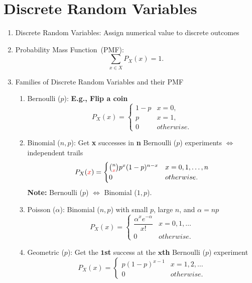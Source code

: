 \chapter{Discrete Random Variables}
\begin{enumerate}
    \item Discrete Random Variables: Assign numerical value to discrete outcomes
    \item Probability Mass Function~(PMF): \[\sum_{x\in X}P_X(x)=1.\]
    \item Families of Discrete Random Variables and their PMF{
        \begin{enumerate}
            \item Bernoulli ($p$): \textbf{E.g., Flip a coin}{
                \[ P_X(x) =
                \begin{cases}
                    1-p & x=0, \\
                    p   & x=1, \\
                    0   & otherwise.
                \end{cases} \]
            }
            \item Binomial ($n, p$): Get \textbf{x} successes in \textbf{n} Bernoulli ($p$) experiments $\iff$ independent trails{
                \[P_X(\textcolor{red}{x}) = {
                    \begin{cases}
                        \binom{n}{\textcolor{red}{x}}p^x(1-p)^{n-x} & x=0,1,\ldots,n \\
                        0 & otherwise.
                    \end{cases}
                }\]
                \textbf{Note:} Bernoulli ($p$) $\iff$ Binomial ($1, p$).
            }
            \item Poisson ($\alpha$): Binomial ($n, p$) with small $p$, large $n$, and $\alpha=np${
                \[ P_X(x) =
                \begin{cases}
                    \dfrac{\alpha^x e^{-\alpha}}{x!}   & x=0,1,\ldots \\
                    0   & otherwise.
                \end{cases} \]
            }
            \item Geometric ($p$): Get the $\bm{1}$\textbf{st} success at the $\bm{x}$\textbf{th} Bernoulli ($p$) experiment {
                \[ P_X(x) =
                \begin{cases}
                    p(1-p)^{x-1} & x=1,2,\ldots \\
                    0   & otherwise.

\end{cases}\]}
\end{enumerate}}
\end{enumerate}
